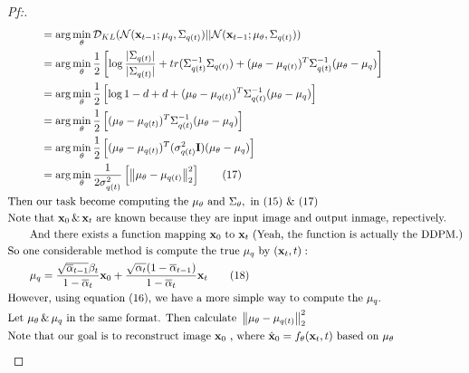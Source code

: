 \documentclass{article}
\begin{document}
\begin{proof}[\textit{Pf:}]
\begin{align}
        &\qquad\quad = \arg\min_{\theta} \mathcal{D}_{KL}(\mathcal{N}(\mathbf{x}_{t-1};\mu_q, \Sigma_{q(t)}) || \mathcal{N}(\mathbf{x}_{t-1}; \mu_{\theta},\Sigma_{q(t)})) \notag \\
        &\qquad\quad = \arg\min_{\theta} \frac{1}{2} \left[ \log \frac{|\Sigma_{q(t)}|}{|\Sigma_{q(t)}|} + tr(\Sigma_{q(t)}^{-1}\Sigma_{q(t)}) + ( \mu_{\theta} - \mu_{q(t)})^T\Sigma_{q(t)}^{-1}(\mu_{\theta} - \mu_{q}) \right] \notag \\
        &\qquad\quad = \arg\min_{\theta} \frac{1}{2} \left[ \log 1 -d + d + ( \mu_{\theta} - \mu_{q(t)})^T\Sigma_{q(t)}^{-1}(\mu_{\theta} - \mu_{q}) \right] \notag \\
        &\qquad\quad = \arg\min_{\theta} \frac{1}{2} \left[ (\mu_{\theta} - \mu_{q(t)})^T\Sigma_{q(t)}^{-1}(\mu_{\theta} - \mu_{q}) \right] \notag \\
        &\qquad\quad = \arg\min_{\theta} \frac{1}{2} \left[ (\mu_{\theta} - \mu_{q(t)})^T(\sigma_{q(t)}^2\mathbf{I})(\mu_{\theta} - \mu_{q}) \right] \notag \\
        &\qquad\quad = \arg\min_{\theta} \frac{1}{2\sigma_{q(t)}^2} \left[ \left\lVert  \mu_{\theta} - \mu_{q(t)} \right\rVert ^2_2 \right] \tag{17} \\
        &\text{Then our task become computing the } \mu_{\theta} \text{ and } \Sigma_{\theta}, \text{ in (15) \& (17)} \notag \\
        &\text{Note that }\mathbf{x}_0\, \& \,\mathbf{x}_t \text{ are known because they are input image and output inmage, repectively. }\notag \\
        &\qquad\text{And there exists a function mapping }\mathbf{x}_0 \text{ to } \mathbf{x}_t \text{ (Yeah, the function is actually the DDPM.)} \notag \\
        &\text{So one considerable method is compute the true }\mu_q \text{ by } (\mathbf{x}_t, t): \notag \\
        &\qquad \mu_q = \frac{\sqrt{\overline{\alpha}_{t-1}}\beta_t}{1-\overline{\alpha}_t}\mathbf{x}_0 + \frac{\sqrt{\alpha_{t}}(1-\overline{\alpha}_{t-1})}{1-\overline{\alpha}_t}\mathbf{x}_t \tag{18} \\
        &\text{However, using equation (16), we have a more simple way to compute the }\mu_q \text{.} \notag \\
        &\text{Let }\mu_{\theta} \,\&\, \mu_q \text{ in the same format. Then calculate } \left\lVert  \mu_{\theta} - \mu_{q(t)} \right\rVert ^2_2  \notag \\
        &\text{Note that our goal is to reconstruct image } \mathbf{x}_0 \text{ , where } \hat{\mathbf{x}}_0 =  f_{\theta}(\mathbf{x}_t, t) \text{ based on } \mu_{\theta} \notag \\ 

\end{align}
\end{proof}
\end{document}
